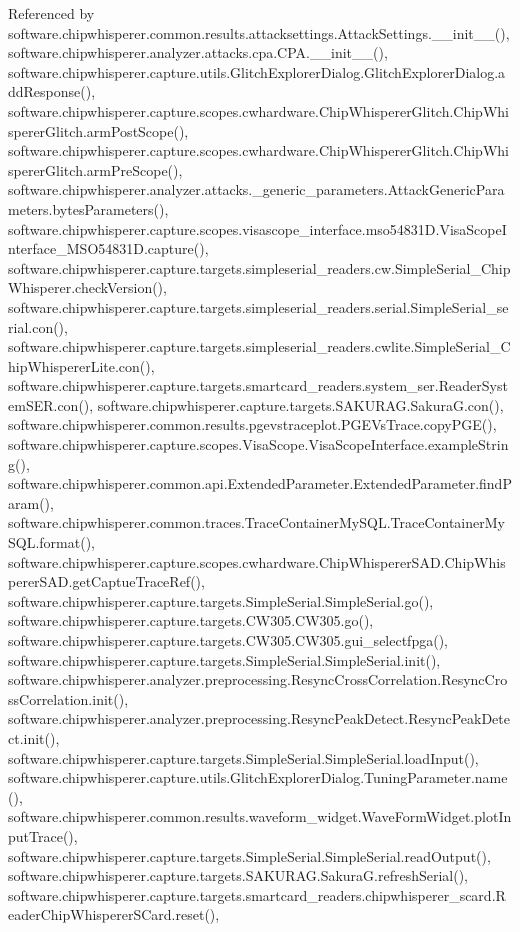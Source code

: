 Referenced by software.\+chipwhisperer.\+common.\+results.\+attacksettings.\+Attack\+Settings.\+\_\+\+\_\+init\+\_\+\+\_\+(), software.\+chipwhisperer.\+analyzer.\+attacks.\+cpa.\+C\+P\+A.\+\_\+\+\_\+init\+\_\+\+\_\+(), software.\+chipwhisperer.\+capture.\+utils.\+Glitch\+Explorer\+Dialog.\+Glitch\+Explorer\+Dialog.\+add\+Response(), software.\+chipwhisperer.\+capture.\+scopes.\+cwhardware.\+Chip\+Whisperer\+Glitch.\+Chip\+Whisperer\+Glitch.\+arm\+Post\+Scope(), software.\+chipwhisperer.\+capture.\+scopes.\+cwhardware.\+Chip\+Whisperer\+Glitch.\+Chip\+Whisperer\+Glitch.\+arm\+Pre\+Scope(), software.\+chipwhisperer.\+analyzer.\+attacks.\+\_\+generic\+\_\+parameters.\+Attack\+Generic\+Parameters.\+bytes\+Parameters(), software.\+chipwhisperer.\+capture.\+scopes.\+visascope\+\_\+interface.\+mso54831\+D.\+Visa\+Scope\+Interface\+\_\+\+M\+S\+O54831\+D.\+capture(), software.\+chipwhisperer.\+capture.\+targets.\+simpleserial\+\_\+readers.\+cw.\+Simple\+Serial\+\_\+\+Chip\+Whisperer.\+check\+Version(), software.\+chipwhisperer.\+capture.\+targets.\+simpleserial\+\_\+readers.\+serial.\+Simple\+Serial\+\_\+serial.\+con(), software.\+chipwhisperer.\+capture.\+targets.\+simpleserial\+\_\+readers.\+cwlite.\+Simple\+Serial\+\_\+\+Chip\+Whisperer\+Lite.\+con(), software.\+chipwhisperer.\+capture.\+targets.\+smartcard\+\_\+readers.\+system\+\_\+ser.\+Reader\+System\+S\+E\+R.\+con(), software.\+chipwhisperer.\+capture.\+targets.\+S\+A\+K\+U\+R\+A\+G.\+Sakura\+G.\+con(), software.\+chipwhisperer.\+common.\+results.\+pgevstraceplot.\+P\+G\+E\+Vs\+Trace.\+copy\+P\+G\+E(), software.\+chipwhisperer.\+capture.\+scopes.\+Visa\+Scope.\+Visa\+Scope\+Interface.\+example\+String(), software.\+chipwhisperer.\+common.\+api.\+Extended\+Parameter.\+Extended\+Parameter.\+find\+Param(), software.\+chipwhisperer.\+common.\+traces.\+Trace\+Container\+My\+S\+Q\+L.\+Trace\+Container\+My\+S\+Q\+L.\+format(), software.\+chipwhisperer.\+capture.\+scopes.\+cwhardware.\+Chip\+Whisperer\+S\+A\+D.\+Chip\+Whisperer\+S\+A\+D.\+get\+Captue\+Trace\+Ref(), software.\+chipwhisperer.\+capture.\+targets.\+Simple\+Serial.\+Simple\+Serial.\+go(), software.\+chipwhisperer.\+capture.\+targets.\+C\+W305.\+C\+W305.\+go(), software.\+chipwhisperer.\+capture.\+targets.\+C\+W305.\+C\+W305.\+gui\+\_\+selectfpga(), software.\+chipwhisperer.\+capture.\+targets.\+Simple\+Serial.\+Simple\+Serial.\+init(), software.\+chipwhisperer.\+analyzer.\+preprocessing.\+Resync\+Cross\+Correlation.\+Resync\+Cross\+Correlation.\+init(), software.\+chipwhisperer.\+analyzer.\+preprocessing.\+Resync\+Peak\+Detect.\+Resync\+Peak\+Detect.\+init(), software.\+chipwhisperer.\+capture.\+targets.\+Simple\+Serial.\+Simple\+Serial.\+load\+Input(), software.\+chipwhisperer.\+capture.\+utils.\+Glitch\+Explorer\+Dialog.\+Tuning\+Parameter.\+name(), software.\+chipwhisperer.\+common.\+results.\+waveform\+\_\+widget.\+Wave\+Form\+Widget.\+plot\+Input\+Trace(), software.\+chipwhisperer.\+capture.\+targets.\+Simple\+Serial.\+Simple\+Serial.\+read\+Output(), software.\+chipwhisperer.\+capture.\+targets.\+S\+A\+K\+U\+R\+A\+G.\+Sakura\+G.\+refresh\+Serial(), software.\+chipwhisperer.\+capture.\+targets.\+smartcard\+\_\+readers.\+chipwhisperer\+\_\+scard.\+Reader\+Chip\+Whisperer\+S\+Card.\+reset(), 